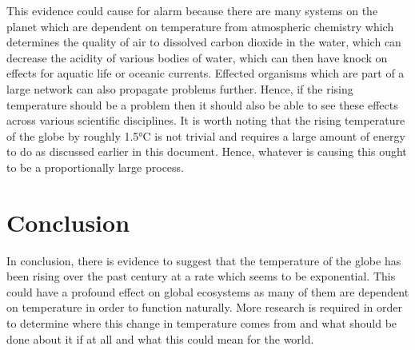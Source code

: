 \documentclass[journal, a4paper]{IEEEtran}
\begin{document}
    This evidence could cause for alarm because there are many systems on the planet which are dependent on temperature from atmospheric chemistry which determines the quality of air to dissolved carbon dioxide in the water, which can decrease the acidity of various bodies of water, which can then have knock on effects for aquatic life or oceanic currents. Effected organisms which are part of a large network can also propagate problems further. Hence, if the rising temperature should be a problem then it should also be able to see these effects across various scientific disciplines. It is worth noting that the rising temperature of the globe by roughly 1.5°C is not trivial and requires a large amount of energy to do as discussed earlier in this document. Hence, whatever is causing this ought to be a proportionally large process.

\section{Conclusion}
	In conclusion, there is evidence to suggest that the temperature of the globe has been rising over the past century at a rate which seems to be exponential. This could have a profound effect on global ecosystems as many of them are dependent on temperature in order to function naturally. More research is required in order to determine where this change in temperature comes from and what should be done about it if at all and what this could mean for the world.

\end{document}
